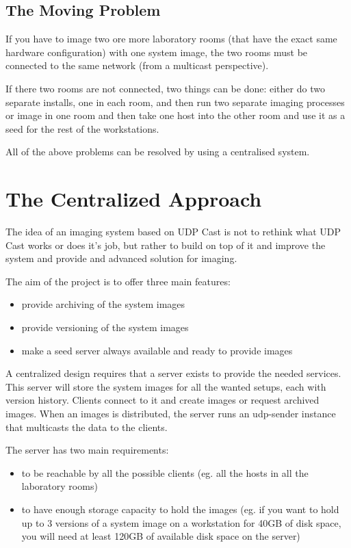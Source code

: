 \subsection{The Moving Problem}

If you have to image two ore more laboratory rooms (that have the exact
same hardware configuration) with one system image, the two rooms must be
connected to the same network (from a multicast perspective).

If there two rooms are not connected, two things can be done: either do two
separate installs, one in each room, and then run two separate imaging
processes or image in one room and then take one host into the other room
and use it as a seed for the rest of the workstations.

\bigskip

All of the above problems can be resolved by using a centralised system.


\section{The Centralized Approach}

The idea of an imaging system based on UDP Cast is not to rethink what UDP
Cast works or does it's job, but rather to build on top of it and improve
the system and provide and advanced solution for imaging.

The aim of the project is to offer three main features:
\begin{itemize}
\item provide archiving of the system images
\item provide versioning of the system images
\item make a seed server always available and ready to provide images
\end{itemize}

A centralized design requires that a server exists to provide the needed
services. This server will store the system images for all the wanted
setups, each with version history. Clients connect to it and create images
or request archived images. When an images is distributed, the server runs
an udp-sender instance that multicasts the data to the clients.

The server has two main requirements:
\begin{itemize}
\item to be reachable by all the possible clients (eg. all the hosts in all
the laboratory rooms)
\item to have enough storage capacity to hold the images (eg. if you want
to hold up to 3 versions of a system image on a workstation for 40GB of disk
space, you will need at least 120GB of available disk space on the server)
\end{itemize}


